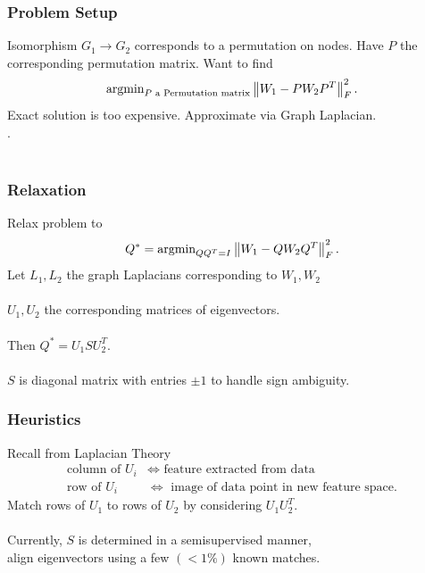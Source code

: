 \documentclass{beamer}
\begin{document}

\begin{frame}
  \frametitle{Problem Setup}
  Isomorphism $G_1\to G_2$ corresponds to a permutation on nodes. Have $P$ the corresponding permutation matrix. Want to find
  \[\text{argmin}_{P\text{ a Permutation matrix}}\left\lVert W_1 - PW_2P^T\right\rVert^2_F.\]
  Exact solution is too expensive. Approximate via Graph Laplacian.\\ \cite{Umeyama1988,Knossow2009}.\\~\\
\end{frame}


\begin{frame}
  \frametitle{Relaxation}
  Relax problem to
  \[Q^* = \text{argmin}_{QQ^T=I}\left\lVert W_1 - QW_2Q^T\right\rVert^2_F.\]
  Let $L_1,L_2$ the graph Laplacians corresponding to $W_1,W_2$ \\~\\
  $U_1,U_2$ the corresponding matrices of eigenvectors. \\~\\
  Then $Q^* = U_1SU_2^T$.\\~\\
  $S$ is diagonal matrix with entries $\pm 1$ to handle sign ambiguity.
\end{frame}


\begin{frame}
  \frametitle{Heuristics}
  Recall from Laplacian Theory
  \begin{align*}
    \text{column of }U_i &\iff \text{ feature extracted from data} \\
    \text{row of }U_i &\iff \text{ image of data point in new feature space}.
  \end{align*}
  Match rows of $U_1$ to rows of $U_2$ by considering $U_1U_2^T$. \\~\\
  Currently, $S$ is determined in a semisupervised manner,\\
  align eigenvectors using a few $(< 1\%)$ known matches.
\end{frame}

\end{document}
